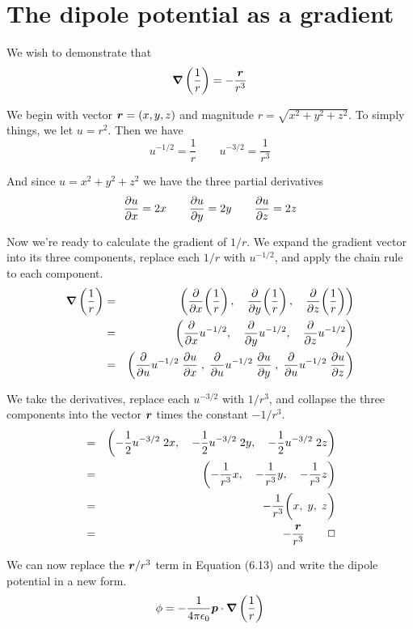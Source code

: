 \section{The dipole potential as a gradient}

We wish to demonstrate that
\[ \boldsymbol{\nabla} \left(\frac{1}{r}\right) = -\frac{\boldsymbol{r}}{r^3} \]

We begin with vector $\boldsymbol{r}=(x,y,z)$ and magnitude $r=\sqrt{x^2+y^2+z^2}$.
To simply things, we let $u=r^2$.  Then we have
\[ u^{-1/2} = \frac{1}{r} \qquad u^{-3/2} = \frac{1}{r^3} \]

And since $u=x^2+y^2+z^2$ we have the three partial derivatives
\[ \frac{\partial u}{\partial x}=2x \qquad \frac{\partial u}{\partial y}=2y \qquad \frac{\partial u}{\partial z}=2z \]

Now we're ready to calculate the gradient of $1/r$.
We expand the gradient vector into its three components,
replace each $1/r$ with $u^{-1/2}$,
and apply the chain rule to each component.
\begin{eqnarray*}
  \boldsymbol{\nabla} \left(\frac{1}{r}\right) 
  &=& \left( \frac{\partial }{\partial x}\!\left(\frac{1}{r}\right),\quad
             \frac{\partial }{\partial y}\!\left(\frac{1}{r}\right),\quad
	     \frac{\partial }{\partial z}\!\left(\frac{1}{r}\right) \right) \\
  &=& \left( \frac{\partial }{\partial x}u^{-1/2},\quad
	     \frac{\partial }{\partial y}u^{-1/2},\quad
	     \frac{\partial }{\partial z}u^{-1/2} \right) \\
  &=& \left( \frac{\partial }{\partial u}u^{-1/2}\;\frac{\partial u}{\partial x} \;,\;
             \frac{\partial }{\partial u}u^{-1/2}\;\frac{\partial u}{\partial y} \;,\;
             \frac{\partial }{\partial u}u^{-1/2}\;\frac{\partial u}{\partial z} \right)
\end{eqnarray*}

We take the derivatives, replace each $u^{-3/2}$ with $1/r^3$,
and collapse the three components into the vector $\boldsymbol{r}$
times the constant $-1/r^3$.
\begin{eqnarray*}
  &=& \left( -\frac{1}{2}u^{-3/2}\;2x,\quad
	     -\frac{1}{2}u^{-3/2}\;2y,\quad
	     -\frac{1}{2}u^{-3/2}\;2z \right) \\
  &=& \left( -\frac{1}{r^3}x,\quad -\frac{1}{r^3}y,\quad -\frac{1}{r^3}z \right) \\
  &=& -\frac{1}{r^3} \bigg(x,\; y,\; z \bigg) \\
  &=& -\frac{\boldsymbol{r}}{r^3} \qquad\Box
\end{eqnarray*}

We can now replace the $\boldsymbol{r}/r^3$ term in Equation (6.13) 
and write the dipole potential in a new form.
\begin{equation}
  \phi = - \frac{1}{4\pi\epsilon_0} \boldsymbol{p} \cdot \boldsymbol{\nabla} \left( \frac{1}{r} \right)
\end{equation}

